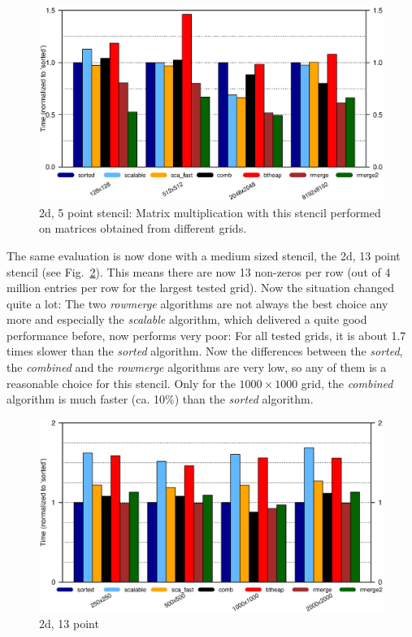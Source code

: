 \begin{figure}[tbp]
	\centering
	\hspace*{-7mm}\includegraphics[width=1.05\textwidth, trim={0 6.9cm 0 1cm},clip]{seq_2d5point}
	\caption{2d, 5 point stencil: Matrix multiplication with this stencil performed on matrices obtained from different grids.} 
	\label{fig:seq2d5point}
\end{figure}

The same evaluation is now done with a medium sized stencil, the 2d, 13 point stencil (see Fig.~\ref{fig:seq2d13point}). This means there are now 13 non-zeros per row (out of 4 million entries per row for the largest tested grid). Now the situation changed quite a lot: The two \textit{rowmerge} algorithms are not always the best choice any more and especially the \textit{scalable} algorithm, which delivered a quite good performance before, now performs very poor: For all tested grids, it is about 1.7 times slower than the \textit{sorted} algorithm. Now the differences between the \textit{sorted}, the \textit{combined} and the \textit{rowmerge} algorithms are very low, so any of them is a reasonable choice for this stencil. Only for the $1000 \times 1000$ grid, the \textit{combined} algorithm is much faster (ca. 10\%) than the \textit{sorted} algorithm.

\begin{figure}[tbp]
	\centering
	\includegraphics[width=1.1\textwidth, trim={0 7.3cm 0 1cm},clip]{seq_2d13point}
	\caption{2d, 13 point} 
	\label{fig:seq2d13point}
\end{figure}


